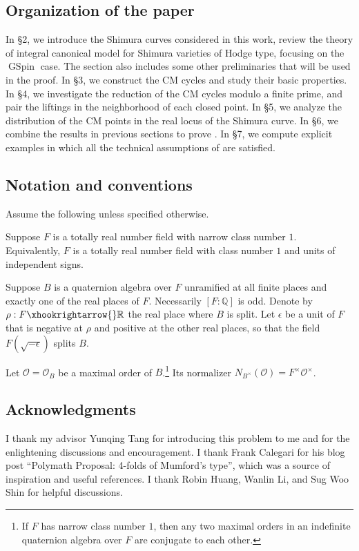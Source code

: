 \documentclass{amsart}
\numberwithin{equation}{subsection}
\numberwithin{theorem}{section}
\theoremstyle{definition}
\theoremstyle{remark}
\newcommand{\bQ}{\mathbb{Q}}
\newcommand{\bR}{\mathbb{R}}
\DeclareMathOperator{\GSpin}{GSpin}
\begin{document}
\subsection{Organization of the paper}

In \S2, we introduce the Shimura curves considered in this work, review the theory of integral canonical model for Shimura varieties of Hodge type, focusing on the $\GSpin$ case. The section also includes some other preliminaries that will be used in the proof. In \S3, we construct the CM cycles and study their basic properties. In \S4, we investigate the reduction of the CM cycles modulo a finite prime, and pair the liftings in the neighborhood of each closed point. In \S5, we analyze the distribution of the CM points in the real locus of the Shimura curve. In \S6, we combine the results in previous sections to prove . In \S7, we compute explicit examples in which all the technical assumptions of  are satisfied. 

\subsection{Notation and conventions}

Assume the following unless specified otherwise. 

Suppose $F$ is a totally real number field with narrow class number $1$. Equivalently, $F$ is a totally real number field with class number $1$ and units of independent signs.  

Suppose $B$ is a quaternion algebra over $F$ unramified at all finite places and exactly one of the real places of $F$. Necessarily $[F:\bQ]$ is odd. Denote by $\rho:F\xhookrightarrow{}\bR$ the real place where $B$ is split. 
Let $\epsilon$ be a unit of $F$ that is negative at $\rho$ and positive at the other real places, so that the field $F(\sqrt{-\epsilon})$ splits $B$.

Let $\mathcal{O} = \mathcal{O}_B$ be a maximal order of $B$.\footnote{If $F$ has narrow class number $1$, then any two maximal orders in an indefinite quaternion algebra over $F$ are conjugate to each other.} 
Its normalizer $N_{B^\times}(\mathcal{O}) = F^\times \mathcal{O}^\times$. 

\subsection*{Acknowledgments} I thank my advisor Yunqing Tang for introducing this problem to me and for the enlightening discussions and encouragement. I thank Frank Calegari for his blog post ``Polymath Proposal: 4-folds of Mumford’s type'', which was a source of inspiration and useful references. I thank Robin Huang, Wanlin Li, and Sug Woo Shin for helpful discussions.
\end{document}
